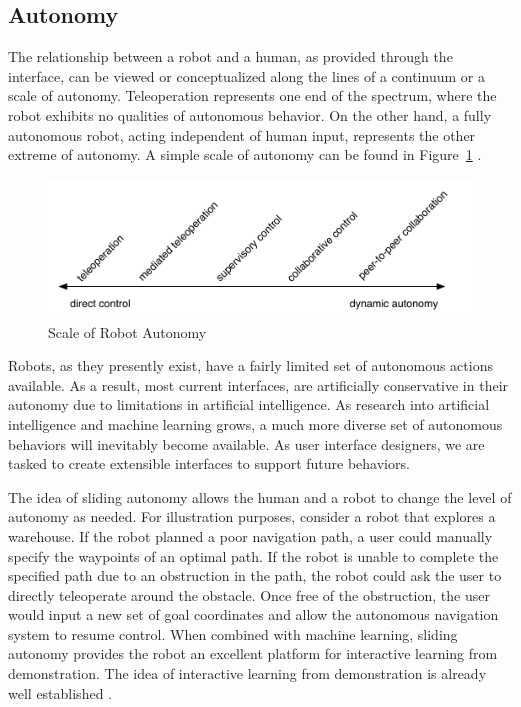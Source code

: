 \subsection{Autonomy}

The relationship between a robot and a human, as provided through the interface, can be viewed or conceptualized along the lines of a continuum or a scale of autonomy. Teleoperation represents one end of the spectrum, where the robot exhibits no qualities of autonomous behavior. On the other hand, a fully autonomous robot, acting independent of human input, represents the other extreme of autonomy. A simple scale of autonomy can be found in Figure~\ref{fig:autonomy} \cite{Goodrich_Survey}.


\begin{figure}[ht]
\begin{center}
\includegraphics[width=5in]{images/autonomy.pdf}
\caption{Scale of Robot Autonomy\label{fig:autonomy}}
\end{center}
\end{figure}

Robots, as they presently exist, have a fairly limited set of autonomous actions available. As a result, most current interfaces, are artificially conservative in their autonomy due to limitations in artificial intelligence. As research into artificial intelligence and machine learning grows, a much more diverse set of autonomous behaviors will inevitably become available. As user interface designers, we are tasked to create extensible interfaces to support future behaviors.

The idea of sliding autonomy allows the human and a robot to change the level of autonomy as needed. For illustration purposes, consider a robot that explores a warehouse. If the robot planned a poor navigation path, a user could manually specify the waypoints of an optimal path. If the robot is unable to complete the specified path due to an obstruction in the path, the robot could ask the user to directly teleoperate around the obstacle. Once free of the obstruction, the user would input a new set of goal coordinates and allow the autonomous navigation system to resume control. When combined with machine learning, sliding autonomy provides the robot an excellent platform for interactive learning from demonstration. The idea of interactive learning from demonstration is already well established \cite{GWAP} \cite{Grollman}.

